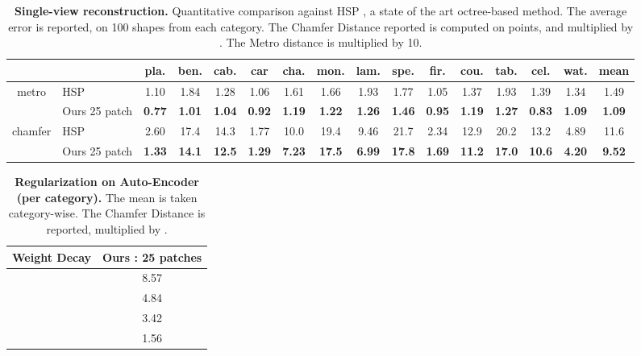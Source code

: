 \documentclass[10pt,twocolumn,letterpaper]{article}
\begin{document}
\begin{table*}[hb!]
\centering
{
\small
  \begin{tabular}{c|l|c|c|c|c|c|c|c|c|c|c|c|c|c|c}
  & &  pla. &  ben. &  cab. &  car &  cha. &  mon. &  lam. &  spe. &  fir. &  cou. &  tab. &  cel. &  wat. &  mean \\
  \hline
 metro & {HSP} &1.10 & 1.84 & 1.28 & 1.06 & 1.61 & 1.66 & 1.93 & 1.77 & 1.05 & 1.37 & 1.93 & 1.39 & 1.34 & 1.49 \\
  & Ours 25 patch & \textbf{0.77} & \textbf{1.01} & \textbf{1.04} & \textbf{0.92} & \textbf{1.19} & \textbf{1.22} & \textbf{1.26} & \textbf{1.46} & \textbf{0.95} & \textbf{1.19} & \textbf{1.27} & \textbf{0.83} & \textbf{1.09} & \textbf{1.09}\\
 \hline
 chamfer & {HSP} & 2.60 & 17.4 & 14.3 & 1.77 & 10.0 & 19.4 & 9.46 & 21.7 & 2.34 & 12.9 & 20.2 & 13.2 & 4.89 &11.6 \\
  & Ours 25 patch & \textbf{1.33} & \textbf{14.1} & \textbf{12.5} & \textbf{1.29} & \textbf{7.23} & \textbf{17.5} & \textbf{6.99} & \textbf{17.8} & \textbf{1.69} & \textbf{11.2} & \textbf{17.0} & \textbf{10.6} & \textbf{4.20} & \textbf{9.52}\\
\hline
  \end{tabular}

  }
  \caption{{\bf Single-view reconstruction.} Quantitative comparison against HSP \cite{Hane:2017}, a state of the art octree-based method. The average error is reported, on 100 shapes from each category. The Chamfer Distance reported is computed on  points, and multiplied by . The Metro distance is multiplied by 10.}
  \label{tab:HSP}
\end{table*}


\begin{table*}
\centering
{
\small
  \begin{tabular}{l|c}
  Weight Decay &  Ours : 25 patches \\
  \hline
 {} &  8.57   \\
 {} &  4.84   \\
 {} &  3.42   \\
 {} &  1.56   \\

\hline
  \end{tabular}

  }
  \caption{\textbf{Regularization on Auto-Encoder (per category).} The mean is taken category-wise. The Chamfer Distance is reported, multiplied by .
  }
  \label{tab:SVR_regul}
\end{table*}
\end{document}
